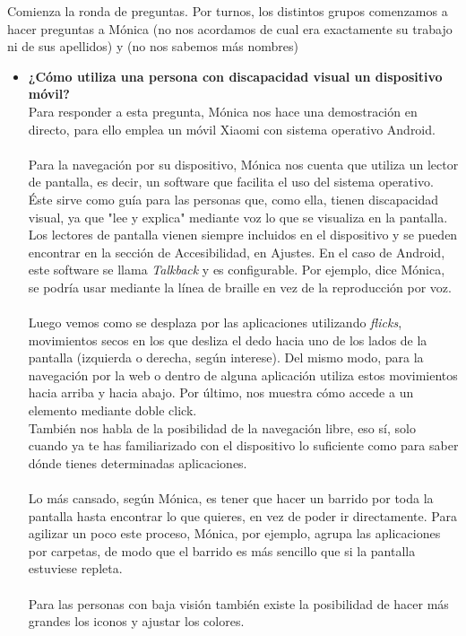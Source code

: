 \documentclass{article}
\begin{document}
	Comienza la ronda de preguntas. Por turnos, los distintos grupos comenzamos a hacer preguntas a Mónica (no nos acordamos de cual era exactamente su trabajo ni de sus apellidos) y (no nos sabemos más nombres)
	\\
	\begin{itemize}
		\item  \textbf{¿Cómo utiliza una persona con discapacidad visual un dispositivo móvil?}
		\\
		Para responder a esta pregunta, Mónica nos hace una demostración en directo, para ello emplea un móvil Xiaomi con sistema operativo Android.
		\\
		\\
		Para la navegación por su dispositivo, Mónica nos cuenta que utiliza un lector de pantalla, es decir, un software que facilita el uso del sistema operativo. Éste sirve como guía para las personas que, como ella, tienen discapacidad visual, ya que "lee y explica" mediante voz lo que se visualiza en la pantalla. Los lectores de pantalla vienen siempre incluidos en el dispositivo y se pueden encontrar en la sección de Accesibilidad, en Ajustes. En el caso de Android, este software se llama \textit{Talkback} y es configurable. Por ejemplo, dice Mónica, se podría usar mediante la línea de braille en vez de la reproducción por voz.
		\\
		\\
		Luego vemos como se desplaza por las aplicaciones utilizando \textit{flicks}, movimientos secos en los que desliza el dedo hacia uno de los lados de la pantalla (izquierda o derecha, según interese). Del mismo modo, para la navegación por la web o dentro de alguna aplicación utiliza estos movimientos hacia arriba y hacia abajo. Por último, nos muestra cómo accede a un elemento mediante doble click. 
		\\
		También nos habla de la posibilidad de la navegación libre, eso sí, solo cuando ya te has familiarizado con el dispositivo lo suficiente como para saber dónde tienes determinadas aplicaciones. 
		\\
		\\
		Lo más cansado, según Mónica, es tener que hacer un barrido por toda la pantalla hasta encontrar lo que quieres, en vez de poder ir directamente. Para agilizar un poco este proceso, Mónica, por ejemplo, agrupa las aplicaciones por carpetas, de modo que el barrido es más sencillo que si la pantalla estuviese repleta.
		\\
		\\
		Para las personas con baja visión también existe la posibilidad de hacer más grandes los iconos y ajustar los colores.
		\\
		

\end{itemize}
\end{document}
